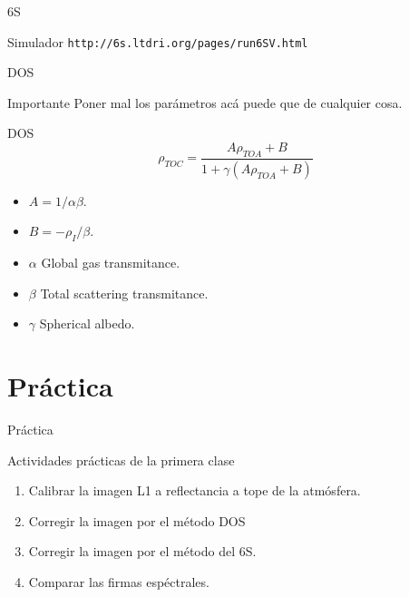 \documentclass[]{beamer}
\begin{document}
\begin{frame}{6S}
  \begin{block}{Simulador}
    \texttt{http://6s.ltdri.org/pages/run6SV.html}
  \end{block}
\end{frame}

\begin{frame}{DOS}
  \begin{alertblock}{Importante}
    Poner mal los parámetros acá puede que de cualquier cosa.
  \end{alertblock}
\end{frame}

\begin{frame}{DOS}
  \begin{equation}
    \rho_{TOC} = \frac{A\rho_{TOA} + B }{1 + \gamma (A\rho_{TOA}+B)}
  \end{equation}\pause
  \begin{itemize}
    \item $A = 1/\alpha\beta$.
    \item $B = -\rho_I/\beta$.
    \item $\alpha$ Global gas transmitance.
    \item $\beta$ Total scattering transmitance.
    \item $\gamma$ Spherical albedo.
  \end{itemize}
\end{frame}
\section{Práctica}

\begin{frame}{Práctica}
  \begin{exampleblock}{Actividades prácticas de la primera clase}
    \begin{enumerate}
      \item Calibrar la imagen L1 a reflectancia a tope de la atmósfera.
      \item Corregir la imagen por el método DOS
      \item Corregir la imagen por el método del 6S.
      \item Comparar las firmas espéctrales.
    \end{enumerate}
  \end{exampleblock}
\end{frame}
\end{document}
